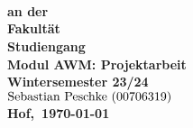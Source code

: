 \begin{titlepage}
        \center
        \textbf{\Large \mytitle}\\[0.5cm]
        \textbf{\large \mysubtitle}\\[0.5cm]

    \vspace{3cm}
    \textbf{\Large \textls{\mydoctype}}\\[0.8cm]
    \textbf{an der \myuniname\\
    Fakultät \myfaculty\\
    Studiengang \mycourse\\
    Modul AWM: Projektarbeit\\
    Wintersemester 23/24}\\[0.5cm]

    $\text{Sebastian Peschke (00706319)}$\\
    \vfill
    \textbf{Hof,~\today}
    \vfill
    
    
\end{titlepage}
\restoregeometry